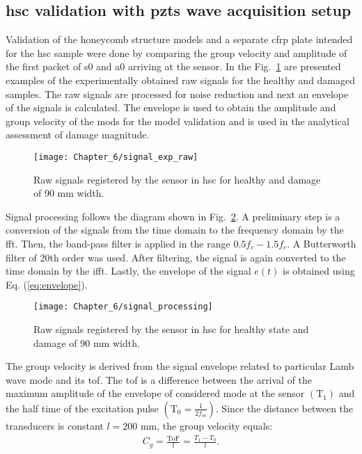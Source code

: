 \subsection{\acs{hsc} validation with \acsp{pzt} wave acquisition setup}
Validation of the honeycomb structure models and a separate \ac{cfrp} plate intended for the \ac{hsc} sample were done by comparing the group velocity and amplitude of the first packet of \ac{s0} and \ac{a0} arriving at the sensor.
In the Fig.~\ref{fig:signal_exp_raw} are presented examples of the experimentally obtained raw signals for the healthy and damaged samples.
The raw signals are processed for noise reduction and next an envelope of the signals is calculated.
The envelope is used to obtain the amplitude and group velocity of the mods for the model validation and is used in the analytical assessment of damage magnitude.
\begin{figure}[!htb]
	\begin{center}
		\texttt{[image: Chapter\_6/signal\_exp\_raw]}
	\end{center}
	\caption{Raw signals registered by the sensor in \acf{hsc} for healthy and damage of 90 \unit{\mm} width.}
	\label{fig:signal_exp_raw}
\end{figure}

Signal processing follows the diagram shown in Fig.~\ref{fig:signal_processing}.
A preliminary step is a conversion of the signals from the time domain to the frequency domain by the \ac{fft}.
Then, the band-pass filter is applied in the range \(0.5f_c-1.5f_c\).
A Butterworth filter of 20th order was used.
After filtering, the signal is again converted to the time domain by the \ac{ifft}.
Lastly, the envelope of the signal \(e(t)\) is obtained using Eq. (\ref{eq:envelope}).

\begin{figure}[!htb]
	\begin{center}
		\texttt{[image: Chapter\_6/signal\_processing]}
	\end{center}
	\caption{Raw signals registered by the sensor in \acf{hsc} for healthy state and damage of 90 \unit{\mm} width.}
	\label{fig:signal_processing}
\end{figure}

The group velocity is derived from the signal envelope related to particular Lamb wave mode and its \ac{tof}.
The \ac{tof} is a difference between the arrival of the maximum amplitude of the envelope of considered mode at the sensor \((\mathrm{T}_1)\) and the half time of the excitation pulse \(\left(\mathrm{T}_0=\frac{1}{2f_m}\right)\).
Since the distance between the transducers is constant \(l=200\) \unit{\mm}, the group velocity equals:
\begin{eqnarray}
	C_g = \frac{\mathrm{ToF}}{l}=\frac{T_1-T_0}{l}.
\end{eqnarray}

